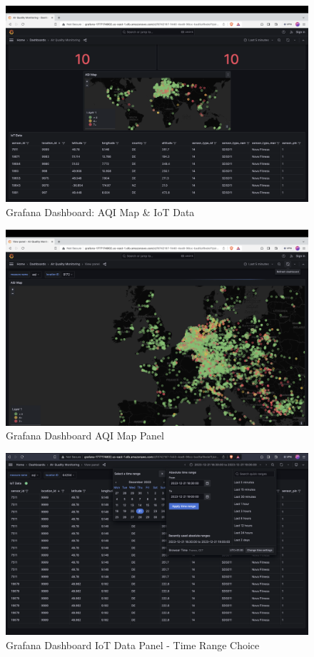 \documentclass[12pt,oneside]{book} %
\begin{document}
\begin{figure}[H]
    \centering
    \includegraphics[width=1\linewidth]{images/grafana-2.png}
    \caption{Grafana Dashboard: AQI Map \& IoT Data}\label{fig:grafana-main-panel-2}
\end{figure}

\begin{figure}[H]
    \centering
    \includegraphics[width=1\linewidth]{images/grafana-4.png}
    \caption{Grafana Dashboard AQI Map Panel}\label{fig:grafana-aqi-map-panel}
\end{figure}

\begin{figure}[H]
    \centering
    \includegraphics[width=1\linewidth]{images/time-range.png}
    \caption{Grafana Dashboard IoT Data Panel - Time Range Choice}\label{fig:grafana-iot-data-panel-time-range}
\end{figure}
\end{document}
